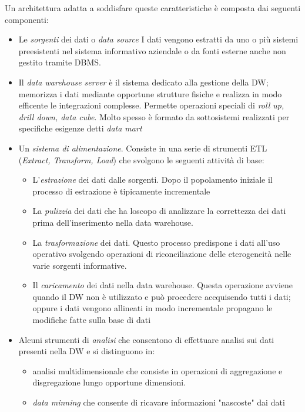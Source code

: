 Un architettura adatta a soddisfare queste caratteristiche è composta dai seguenti componenti:
\begin{itemize}
\item Le \emph{sorgenti} dei dati o \emph{data source} I dati vengono estratti da uno o più sistemi preesistenti nel sistema informativo aziendale o da fonti esterne anche non gestito tramite DBMS.
\item Il \emph{data warehouse server} è il sistema dedicato alla gestione della DW; memorizza i dati mediante opportune strutture fisiche  e realizza in modo efficente le integrazioni complesse. Permette operazioni speciali di \emph{roll up, drill down, data cube}. Molto spesso è formato da sottosistemi realizzati per specifiche esigenze detti \emph{data mart}
\item Un \emph{sistema di alimentazione}. Consiste in una serie di strumenti ETL (\emph{Extract, Transform, Load}) che svolgono le seguenti attività di base:
\begin{itemize}
\item L'\emph{estrazione} dei dati dalle sorgenti. Dopo il popolamento iniziale il processo di estrazione è tipicamente incrementale
\item La \emph{pulizzia} dei dati che ha loscopo di analizzare la correttezza dei dati prima dell'inserimento nella data warehouse.
\item La \emph{trasformazione} dei dati. Questo processo predispone i dati all'uso operativo svolgendo operazioni di riconciliazione delle eterogeneità nelle varie sorgenti informative.
\item Il \emph{caricamento} dei dati nella data warehouse. Questa operazione avviene quando il DW non è utilizzato e può procedere accquisendo tutti i dati; oppure i dati vengono allineati in modo incrementale propagano le modifiche fatte sulla base di dati
\end{itemize}
\item Alcuni strumenti di \emph{analisi} che consentono di effettuare analisi sui dati presenti nella DW e si distinguono in:
\begin{itemize}
\item analisi multidimensionale che consiste in operazioni di aggregazione e disgregazione lungo opportune dimensioni.
\item \emph{data minning} che consente di ricavare informazioni "nascoste" dai dati
\end{itemize}
\end{itemize}

